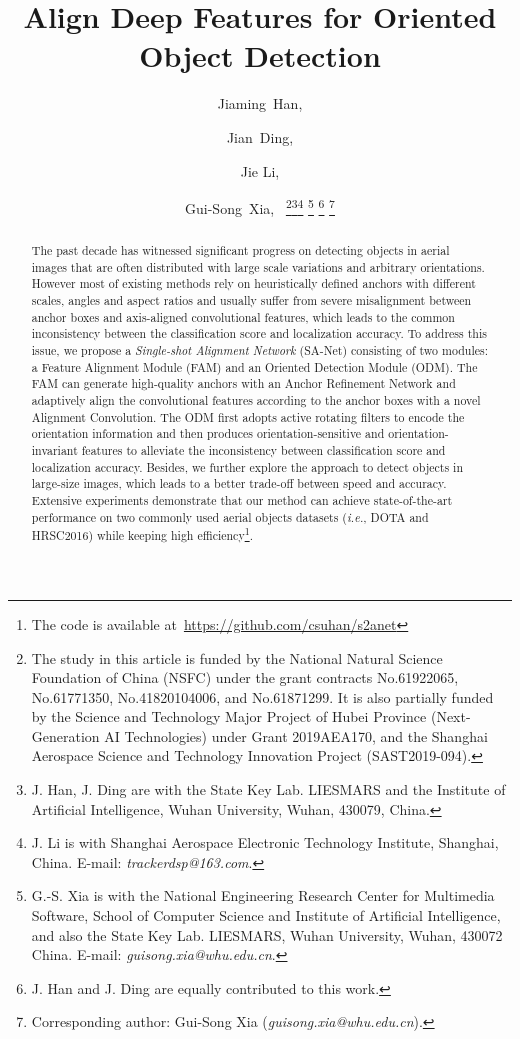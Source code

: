 \documentclass[10pt,journal,final]{IEEEtran}
\def\ie{{\em i.e.}}
\begin{document}
\title{Align Deep Features for Oriented Object Detection}

\author{Jiaming~Han,
        \and Jian~Ding, 
        \and Jie Li,
        \and Gui-Song~Xia,~
\thanks{The study in this article is funded by the National Natural Science Foundation of China (NSFC) under the grant contracts No.61922065, No.61771350, No.41820104006, and No.61871299. It is also partially funded by the Science and Technology Major Project of Hubei Province (Next-Generation AI Technologies) under Grant 2019AEA170, and the Shanghai Aerospace Science and Technology Innovation Project (SAST2019-094).}\thanks{J. Han, J. Ding are with the State Key Lab. LIESMARS and the Institute of Artificial Intelligence, Wuhan University, Wuhan, 430079, China.}\thanks{J. Li is with Shanghai Aerospace Electronic Technology Institute, Shanghai, China. E-mail: {\em trackerdsp@163.com}.}
\thanks{G.-S. Xia is with the National Engineering Research Center for Multimedia Software, School of Computer Science and Institute of Artificial Intelligence, and also the State Key Lab. LIESMARS, Wuhan University, Wuhan, 430072 China. E-mail: {\em guisong.xia@whu.edu.cn}.}
\thanks{J. Han and J. Ding are equally contributed to this work.}
\thanks{Corresponding author: Gui-Song Xia ({\em guisong.xia@whu.edu.cn}).}
}
\maketitle

\begin{abstract}
The past decade has witnessed significant progress on detecting objects in aerial images that are often distributed with large scale variations and arbitrary orientations. However most of existing methods rely on heuristically defined anchors with different scales, angles and aspect ratios and usually suffer from severe misalignment between anchor boxes and axis-aligned convolutional features, which leads to the common inconsistency between the classification score and localization accuracy. To address this issue, we propose a {\em Single-shot Alignment Network} (SA-Net) consisting of two modules: a Feature Alignment Module (FAM) and an Oriented Detection Module (ODM). The FAM can generate high-quality anchors with an Anchor Refinement Network and adaptively align the convolutional features according to the anchor boxes with a novel Alignment Convolution. The ODM first adopts active rotating filters to encode the orientation information and then produces orientation-sensitive and orientation-invariant features to alleviate the inconsistency between classification score and localization accuracy. Besides, we further explore the approach to detect objects in large-size images, which leads to a better trade-off between speed and accuracy. Extensive experiments demonstrate that our method can achieve state-of-the-art performance on two commonly used aerial objects datasets (\ie, DOTA and HRSC2016) while keeping high efficiency\footnote{The code is available at~\url{https://github.com/csuhan/s2anet}}.
\end{abstract}
\end{document}
